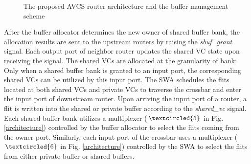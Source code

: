 \documentclass[10pt,conference]{IEEEtran}
\begin{document}
\begin{figure}
  \caption{The proposed AVCS router architecture and the buffer management scheme}
\end{figure}

After the buffer allocator determines the new owner of shared buffer bank, the allocation results are sent to the upstream routers by raising the \emph{sbuf\_grant} signal. Each output port of neighbor router updates the shared VC state upon receiving the signal. The shared VCs are allocated at the granularity of bank: Only when a shared buffer bank is granted to an input port, the corresponding shared VCs can be utilized by this input port. The SWA schedules the flits located at both shared VCs and private VCs to traverse the crossbar and enter the input port of downstream router. Upon arriving the input port of a router, a flit is written into the shared or private buffer according to the \emph{shared\_vc} signal. Each shared buffer bank utilizes a multiplexer ($\textcircled{5}$ in Fig. \ref{architecture}) controlled by the buffer allocator to select the flits coming from the owner port. Similarly, each input port of the crossbar uses a multiplexer ($\textcircled{6}$ in Fig. \ref{architecture}) controlled by the SWA to select the flits from either private buffer or shared buffers.
\end{document}
